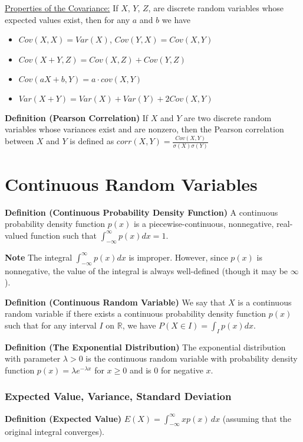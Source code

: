 \underline{Properties of the Covariance:}
If $X$, $Y$, $Z$, are discrete random variables whose expected values exist, then for any $a$ and $b$ we have \begin{itemize}
    \item $Cov(X,X) = Var(X)$, $Cov(Y, X) = Cov(X, Y)$
    \item $Cov(X + Y, Z) = Cov(X, Z) + Cov(Y, Z)$
    \item $Cov(aX + b, Y) = a \cdot cov(X, Y)$
    \item $Var(X + Y) = Var(X) + Var(Y) + 2Cov(X, Y)$
\end{itemize}

\textbf{Definition (Pearson Correlation)} If $X$ and $Y$ are two discrete random variables whose variances exist and are nonzero, then the Pearson correlation between $X$ and $Y$ is defined as $corr(X, Y) = \frac{Cov(X, Y)}{\sigma(X)\sigma(Y)}$

\section{Continuous Random Variables}

\textbf{Definition (Continuous Probability Density Function)} A continuous probability density function $p(x)$ is a piecewise-continuous, nonnegative, real-valued function such that $\int_{-\infty}^{\infty} p(x) dx = 1$.

\textbf{Note} The integral $\int_{-\infty}^{\infty} p(x) dx$ is improper. However, since $p(x)$ is nonnegative, the value of the integral is always well-defined (though it may be $\infty$).

\textbf{Definition (Continuous Random Variable)} We say that $X$ is a continuous random variable if there exists a continuous probability density function $p(x)$ such that for any interval $I$ on $\mathbb{R}$, we have $P(X \in I) = \int_I p(x)dx$.

\textbf{Definition (The Exponential Distribution)} The exponential distribution with parameter $\lambda > 0$ is the continuous random variable with probability density function $p(x) = \lambda e^{-\lambda x}$ for $x \geq 0$ and is 0 for negative $x$.

\subsubsection{Expected Value, Variance, Standard Deviation}

\textbf{Definition (Expected Value)} $E(X) = \int_{-\infty}^{\infty} xp(x) \, dx$ (assuming that the original integral converges).


